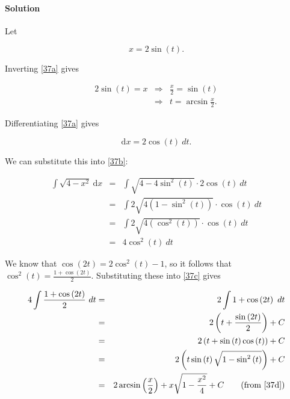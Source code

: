 
\paragraph{Solution} 

Let

\begin{equation}
	x=2\sin\left(t\right)\label{37a}.
\end{equation}

Inverting \ref{37a} gives

\begin{eqnarray}
	2\sin\left(t\right)=x&\Rightarrow&\frac{x}{2}=\sin\left(t\right)\nonumber\\
	&\Rightarrow&t=\arcsin\frac{x}{2}.\label{37d}
\end{eqnarray}

Differentiating \ref{37a} gives

\[\mbox{d}x=2\cos\left(t\right)~dt.\]

We can substitute this into \ref{37b}:

\begin{eqnarray}
	\int\sqrt{4-x^2}~\mbox{d}x&=&\int\sqrt{4-4\sin^2\left(t\right)}\cdot2\cos\left(t\right)~dt\nonumber\\
	&=&\int2\sqrt{4\left(1-\sin^2\left(t\right)\right)}\cdot\cos\left(t\right)~dt\nonumber\\
	&=&\int2\sqrt{4\left(\cos^2\left(t\right)\right)}\cdot\cos\left(t\right)~dt\nonumber\\
	&=&4\cos^2\left(t\right)~dt\label{37c}
\end{eqnarray}

We know that $\cos\left(2t\right)=2\cos^2\left(t\right)-1$, so it follows that $\cos^2\left(t\right)=\frac{1+\cos\left(2t\right)}{2}$. Substituting these into \ref{37c} gives

\begin{eqnarray*}
	4\int\frac{1+\cos\left(2t\right)}{2}~dt&=&2\int1+\cos\left(2t\right)~dt\\
	&=&2\left(t+\frac{\sin\left(2t\right)}{2}\right)+C\\
	&=&2\left(t+\sin\left(t\right)\cos\left(t\right)\right)+C\\
	&=&2\left(t\sin\left(t\right)\sqrt{1-\sin^2\left(t\right)}\right)+C\\
	&=&2\arcsin\left(\frac{x}{2}\right)+x\sqrt{1-\frac{x^2}{4}}+C\qquad\mbox{(from \ref{37d})}
\end{eqnarray*}
